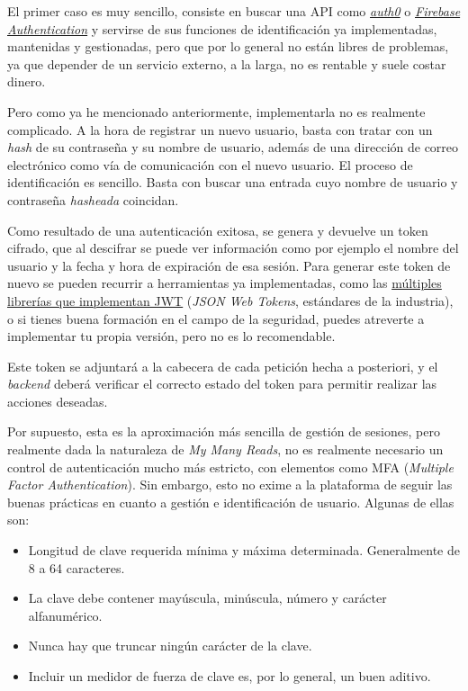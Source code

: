 El primer caso es muy sencillo, consiste en buscar una API como \href{https://auth0.com/docs/api/authentication}{\textit{auth0}} o \href{https://firebase.google.com/docs/auth?hl=es-419}{\textit{Firebase Authentication}} y servirse de sus funciones de identificación ya implementadas, mantenidas y gestionadas, pero que por lo general no están libres de problemas, ya que depender de un servicio externo, a la larga, no es rentable y suele costar dinero.

Pero como ya he mencionado anteriormente, implementarla no es realmente complicado. A la hora de registrar un nuevo usuario, basta con tratar con un \textit{hash} de su contraseña y su nombre de usuario, además de una dirección de correo electrónico como vía de comunicación con el nuevo usuario. El proceso de identificación es sencillo. Basta con buscar una entrada cuyo nombre de usuario y contraseña \textit{hasheada} coincidan.

Como resultado de una autenticación exitosa, se genera y devuelve un token cifrado, que al descifrar se puede ver información como por ejemplo el nombre del usuario y la fecha y hora de expiración de esa sesión. Para generar este token de nuevo se pueden recurrir a herramientas ya implementadas, como las \href{https://jwt.io/libraries}{múltiples librerías que implementan JWT} (\textit{JSON Web Tokens}, estándares de la industria), o si tienes buena formación en el campo de la seguridad, puedes atreverte a implementar tu propia versión, pero no es lo recomendable.

Este token se adjuntará a la cabecera de cada petición hecha a posteriori, y el \textit{backend} deberá verificar el correcto estado del token para permitir realizar las acciones deseadas.

Por supuesto, esta es la aproximación más sencilla de gestión de sesiones, pero realmente dada la naturaleza de \textit{My Many Reads}, no es realmente necesario un control de autenticación mucho más estricto, con elementos como MFA (\textit{Multiple Factor Authentication}). Sin embargo, esto no exime a la plataforma de seguir las buenas prácticas en cuanto a gestión e identificación de usuario. Algunas de ellas son:

\begin{itemize}
    \item Longitud de clave requerida mínima y máxima determinada. Generalmente de 8 a 64 caracteres.
    \item La clave debe contener mayúscula, minúscula, número y carácter alfanumérico.
    \item Nunca hay que truncar ningún carácter de la clave.
    \item Incluir un medidor de fuerza de clave es, por lo general, un buen aditivo.
\end{itemize}

